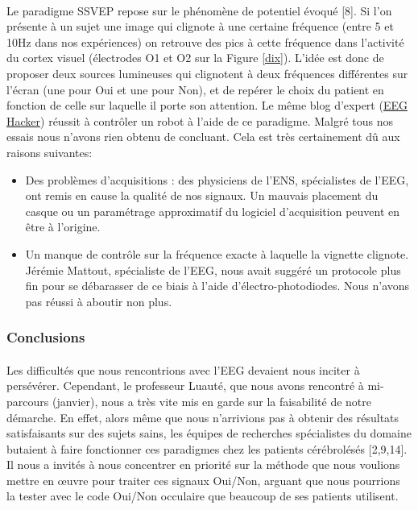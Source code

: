 \documentclass[11pt,a4paper]{article}
\theoremstyle{plain}
\theoremstyle{definition}
\begin{document}
\paragraph{} Le paradigme SSVEP repose sur le phénomène de potentiel évoqué [8]. Si l'on présente à un sujet une image qui clignote à une certaine fréquence (entre 5 et 10Hz dans nos expériences) on retrouve 
des pics à cette fréquence dans l'activité du cortex visuel (électrodes O1 et O2 sur la Figure \ref{dix}). L'idée est donc de proposer deux sources lumineuses qui clignotent à deux fréquences différentes sur l'écran (une pour Oui et une pour Non), et de repérer le choix du patient en fonction de celle sur laquelle il porte son attention. Le même blog d'expert (\href{http://eeghacker.blogspot.com/}{EEG Hacker}) réussit à contrôler un robot à l'aide de ce paradigme.
Malgré tous nos essais nous n'avons rien obtenu de concluant. Cela est très certainement dû aux raisons suivantes:

\begin{itemize}
\item Des problèmes d'acquisitions : des physiciens de l'ENS, spécialistes de l'EEG, ont remis en cause la qualité de nos signaux. Un mauvais placement du casque ou un paramétrage approximatif du logiciel d'acquisition peuvent en être à l'origine.
\item Un manque de contrôle sur la fréquence exacte à laquelle la vignette clignote. Jérémie Mattout, spécialiste de l'EEG, nous avait suggéré un protocole
plus fin pour se débarasser de ce biais à l'aide d'électro-photodiodes. Nous n'avons pas réussi à aboutir non plus.
\end{itemize}

\subsubsection{Conclusions}

\paragraph{} Les difficultés que nous rencontrions avec l'EEG devaient nous inciter à persévérer. Cependant, le professeur Luauté, que nous avons rencontré à mi-parcours (janvier), nous a très vite mis en garde sur la faisabilité de notre démarche. En effet, alors même que nous n'arrivions pas à obtenir des résultats satisfaisants sur des sujets sains, les équipes de recherches spécialistes du domaine butaient à faire fonctionner ces paradigmes chez les patients cérébrolésés [2,9,14]. Il nous a invités à nous concentrer en priorité sur la méthode que nous voulions mettre en \oe uvre pour traiter ces signaux Oui/Non, arguant que nous pourrions la tester avec le code Oui/Non occulaire que beaucoup de ses patients utilisent. 
\end{document}

